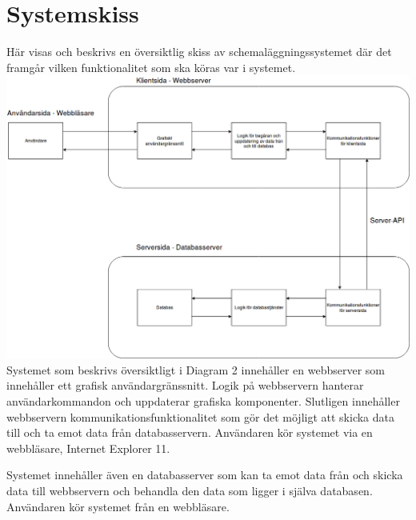\documentclass[a4paper,10pt]{article}
\begin{document}
\section{Systemskiss}
\label{sec:Systemskiss}
Här visas och beskrivs en översiktlig skiss av schemaläggningssystemet där det framgår vilken funktionalitet som ska köras var i systemet. \\
\includegraphics[width=.9\linewidth,height=.7\textheight]{Systemskiss.png}
\\
Systemet som beskrivs översiktligt i Diagram 2 innehåller en webbserver som innehåller ett grafisk användargränssnitt. Logik på webbservern hanterar användarkommandon och uppdaterar grafiska komponenter. Slutligen innehåller webbservern kommunikationsfunktionalitet som gör det möjligt att skicka data till och ta emot data från databasservern. Användaren kör systemet via en webbläsare, Internet Explorer 11.

Systemet innehåller även en databasserver som kan ta emot data från och skicka data till webbservern och behandla den data som ligger i själva databasen. Användaren kör systemet från en webbläsare.
\end{document}
